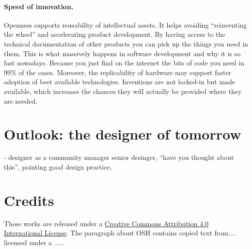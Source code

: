 \documentclass{article}
\begin{document}
\paragraph{Speed of innovation.} Openness supports reusability of intellectual assets. It helps avoiding ``reinventing the wheel'' and accelerating product development. By having access to the technical documentation of other products you can pick up the things you need in them. This is what massively happens in software development and why it is so fast nowadays. Because you just find on the internet the bits of code you need in 99\% of the cases. Moreover, the replicability of hardware may support faster adoption of best available technologies. Inventions are not locked-in but made available, which increases the chances they will actually be provided where they are needed.

\section{Outlook: the designer of tomorrow}
\label{sec:designerofthefuture}
- designer as a community manager
senior desinger, "`have you thought about this"', pointing good design practice,

\section*{Credits}
\label{sec:credits}
These works are released under a \href{https://creativecommons.org/licenses/by/4.0/}{Creative Commons Attribution 4.0 International License}. {\color{red}The paragraph about OSH contains copied text from.... licensed under a .....}

\begin{comment}
https://www.researchgate.net/publication/320601945_Distributed_economies_through_open_design_and_digital_manufacturing

\end{comment}



\end{document}
